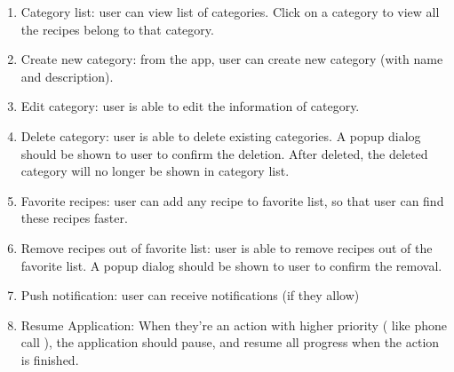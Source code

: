 \documentclass{article}
\begin{document}
\begin{enumerate}
        \item Category list: user can view list of categories. Click on a category to view all the recipes belong to that category.
        \item Create new category: from the app, user can create new category (with name and description).
        \item Edit category: user is able to edit the information of category.
        \item Delete category: user is able to delete existing categories. A popup dialog should be shown to user to confirm the deletion. After deleted, the deleted category will no longer be shown in category list.
        \item Favorite recipes: user can add any recipe to favorite list, so that user can find these recipes faster.
        \item Remove recipes out of favorite list: user is able to remove recipes out of the favorite list. A popup dialog should be shown to user to confirm the removal.
        \item Push notification: user can receive notifications (if they allow)
        \item Resume Application: When they're an action with higher priority ( like phone call ), the application should pause, and resume all progress when the action is finished.
    \end{enumerate}
\end{document}
